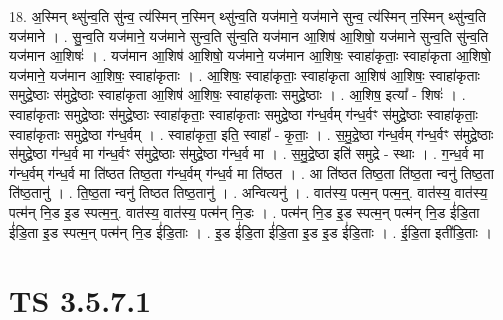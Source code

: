 \documentclass[17pt]{extarticle}
\begin{document}
18. अ॒स्मिन् थ्सु॑न्व॒ति सु॑न्व॒ त्य॑स्मिन् न॒स्मिन् थ्सु॑न्व॒ति यज॑माने॒ यज॑माने सुन्व॒ त्य॑स्मिन् न॒स्मिन् थ्सु॑न्व॒ति यज॑माने । . सु॒न्व॒ति यज॑माने॒ यज॑माने सुन्व॒ति सु॑न्व॒ति यज॑मान आ॒शिष॑ आ॒शिषो॒ यज॑माने सुन्व॒ति सु॑न्व॒ति यज॑मान आ॒शिषः॑ । . यज॑मान आ॒शिष॑ आ॒शिषो॒ यज॑माने॒ यज॑मान आ॒शिषः॒ स्वाहा॑कृताः॒ स्वाहा॑कृता आ॒शिषो॒ यज॑माने॒ यज॑मान आ॒शिषः॒ स्वाहा॑कृताः । . आ॒शिषः॒ स्वाहा॑कृताः॒ स्वाहा॑कृता आ॒शिष॑ आ॒शिषः॒ स्वाहा॑कृताः समुद्रे॒ष्ठाः स॑मुद्रे॒ष्ठाः स्वाहा॑कृता आ॒शिष॑ आ॒शिषः॒ स्वाहा॑कृताः समुद्रे॒ष्ठाः । . आ॒शिष॒ इत्या᳚ - शिषः॑ । . स्वाहा॑कृताः समुद्रे॒ष्ठाः स॑मुद्रे॒ष्ठाः स्वाहा॑कृताः॒ स्वाहा॑कृताः समुद्रे॒ष्ठा ग॑न्ध॒र्वम् ग॑न्ध॒र्वꣳ स॑मुद्रे॒ष्ठाः स्वाहा॑कृताः॒ स्वाहा॑कृताः समुद्रे॒ष्ठा ग॑न्ध॒र्वम् । . स्वाहा॑कृता॒ इति॒ स्वाहा᳚ - कृ॒ताः॒ । . स॒मु॒द्रे॒ष्ठा ग॑न्ध॒र्वम् ग॑न्ध॒र्वꣳ स॑मुद्रे॒ष्ठाः स॑मुद्रे॒ष्ठा ग॑न्ध॒र्व मा ग॑न्ध॒र्वꣳ स॑मुद्रे॒ष्ठाः स॑मुद्रे॒ष्ठा ग॑न्ध॒र्व मा । . स॒मु॒द्रे॒ष्ठा इति॑ समुद्रे - स्थाः । . ग॒न्ध॒र्व मा ग॑न्ध॒र्वम् ग॑न्ध॒र्व मा ति॑ष्ठत तिष्ठ॒ता ग॑न्ध॒र्वम् ग॑न्ध॒र्व मा ति॑ष्ठत । . आ ति॑ष्ठत तिष्ठ॒ता ति॑ष्ठ॒ता न्वनु॑ तिष्ठ॒ता ति॑ष्ठ॒तानु॑ । . ति॒ष्ठ॒ता न्वनु॑ तिष्ठत तिष्ठ॒तानु॑ । . अन्वित्यनु॑ । . वात॑स्य॒ पत्म॒न् पत्म॒न्॒. वात॑स्य॒ वात॑स्य॒ पत्म॑न् नि॒ड इ॒ड स्पत्म॒न्॒. वात॑स्य॒ वात॑स्य॒ पत्म॑न् नि॒डः । . पत्म॑न् नि॒ड इ॒ड स्पत्म॒न् पत्म॑न् नि॒ड ई॑डि॒ता ई॑डि॒ता इ॒ड स्पत्म॒न् पत्म॑न् नि॒ड ई॑डि॒ताः । . इ॒ड ई॑डि॒ता ई॑डि॒ता इ॒ड इ॒ड ई॑डि॒ताः । . ई॒डि॒ता इती॑डि॒ताः । \newline
\pagebreak
{}

\section{ TS 3.5.7.1 }
\end{document}
